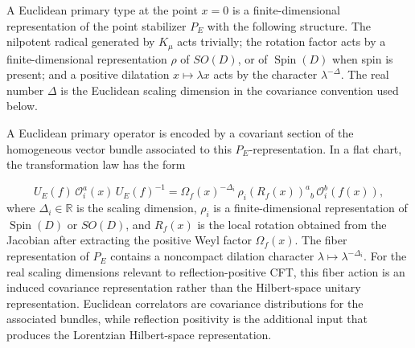 \begin{definition}
\label{def:euclidean-primary-parabolic-type}
A Euclidean primary type at the point \(x=0\) is a finite-dimensional
representation of the point stabilizer \(P_E\) with the following structure.
The nilpotent radical generated by \(K_\mu\) acts trivially; the rotation
factor acts by a finite-dimensional representation \(\rho\) of \(SO(D)\), or
of \(\operatorname{Spin}(D)\) when spin is present; and a positive dilatation
\(x\mapsto\lambda x\) acts by the character \(\lambda^{-\Delta}\).  The real
number \(\Delta\) is the Euclidean scaling dimension in the covariance
convention used below.
\end{definition}

A Euclidean primary operator is encoded by a covariant section of the
homogeneous vector bundle associated to this \(P_E\)-representation.  In a
flat chart, the transformation law has the form
\begin{definition}
\label{def:euclidean-primary-covariance-law}
\begin{equation}
  U_E(f)\,\mathcal O_i^a(x)\,U_E(f)^{-1}
  =
  \Omega_f(x)^{-\Delta_i}\,
  \rho_i(R_f(x))^a{}_b\,
  \mathcal O_i^b(f(x)),
  \label{eq:euclidean-primary-induced-representation}
\end{equation}
where \(\Delta_i\in\mathbb R\) is the scaling dimension,
\(\rho_i\) is a finite-dimensional representation of \(\operatorname{Spin}(D)\)
or \(SO(D)\), and \(R_f(x)\) is the local rotation obtained from the
Jacobian after extracting the positive Weyl factor \(\Omega_f(x)\).  The
fiber representation of \(P_E\) contains a noncompact dilation character
\(\lambda\mapsto\lambda^{-\Delta_i}\).  For the real scaling dimensions
relevant to reflection-positive CFT, this fiber action is an induced
covariance representation rather than the Hilbert-space unitary
representation.  Euclidean correlators are covariance distributions for the
associated bundles, while reflection positivity is the additional input that
produces the Lorentzian Hilbert-space representation.
\end{definition}

